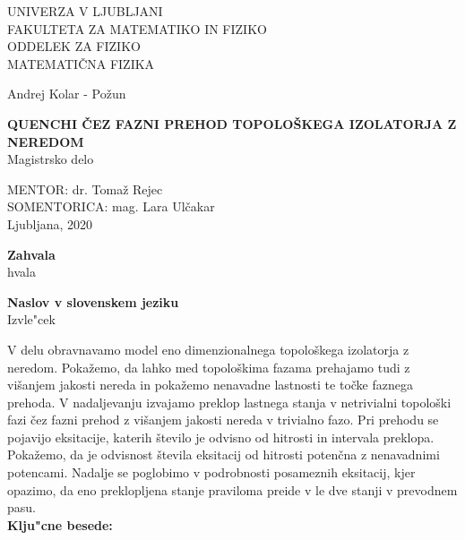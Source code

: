 \pagestyle{empty}
\begin{center}

{\large UNIVERZA V LJUBLJANI\\
FAKULTETA ZA MATEMATIKO IN FIZIKO\\
ODDELEK ZA FIZIKO\\
MATEMATIČNA FIZIKA\\}


\vspace{4cm}


{\Large Andrej Kolar - Požun\\}

\vspace{10mm}

{\bf \Large QUENCHI ČEZ FAZNI PREHOD TOPOLOŠKEGA IZOLATORJA Z NEREDOM}\\
\vspace{5mm}
{\large Magistrsko delo}\\




\vfill



{\large MENTOR: dr. Tomaž Rejec\\
SOMENTORICA: mag. Lara Ulčakar\\


\vspace{2cm}
Ljubljana, 2020}

\end{center}


\cleardoublepage
\mbox{}
\vfill
{\Large \bf Zahvala}
\vspace{1cm}\\
hvala


\cleardoublepage
\begin{center}
{\bf Naslov v slovenskem jeziku}\\[3mm]
{\sc  Izvle"cek}
\end{center}
\vspace{10mm}
V delu obravnavamo model eno dimenzionalnega topološkega izolatorja z neredom. Pokažemo, da lahko med topološkima fazama prehajamo tudi z višanjem jakosti nereda in pokažemo nenavadne lastnosti te točke faznega prehoda. V nadaljevanju izvajamo preklop lastnega stanja v netrivialni topološki fazi čez fazni prehod z višanjem jakosti nereda v trivialno fazo. Pri prehodu se pojavijo eksitacije, katerih število je odvisno od hitrosti in intervala preklopa. Pokažemo, da je odvisnost števila eksitacij od hitrosti potenčna z nenavadnimi potencami. Nadalje se poglobimo v podrobnosti posameznih eksitacij, kjer opazimo, da eno preklopljena stanje praviloma preide v le dve stanji v prevodnem pasu. \\[10mm]
{\bf Klju"cne besede:}\\[3mm]

